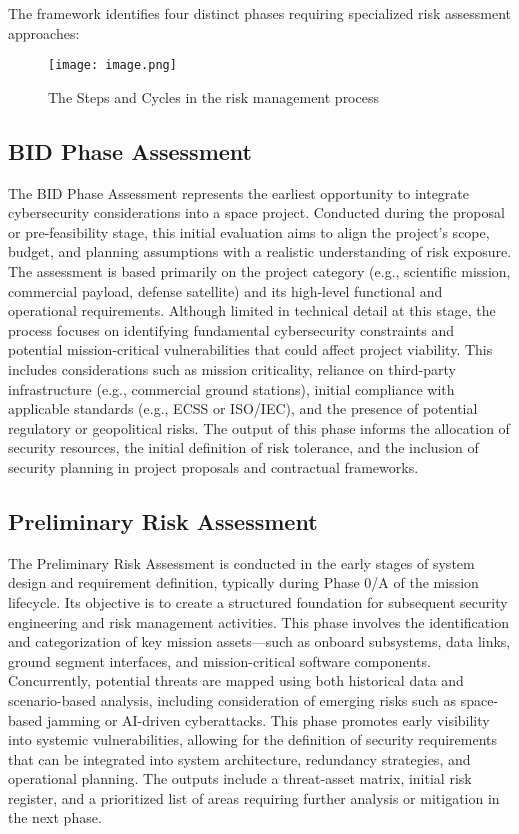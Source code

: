 \documentclass[binding=0.6cm]{sapthesis}
\begin{document}
The framework identifies four distinct phases requiring specialized risk assessment approaches:
\begin{figure}
    \centering
    \texttt{[image: image.png]}
    \caption{The Steps and Cycles in the risk management process}
    \label{fig:enter-label}
\end{figure}

\subsection{BID Phase Assessment}
The BID Phase Assessment represents the earliest opportunity to integrate cybersecurity considerations into a space project. Conducted during the proposal or pre-feasibility stage, this initial evaluation aims to align the project’s scope, budget, and planning assumptions with a realistic understanding of risk exposure. The assessment is based primarily on the project category (e.g., scientific mission, commercial payload, defense satellite) and its high-level functional and operational requirements. Although limited in technical detail at this stage, the process focuses on identifying fundamental cybersecurity constraints and potential mission-critical vulnerabilities that could affect project viability. This includes considerations such as mission criticality, reliance on third-party infrastructure (e.g., commercial ground stations), initial compliance with applicable standards (e.g., ECSS or ISO/IEC), and the presence of potential regulatory or geopolitical risks. The output of this phase informs the allocation of security resources, the initial definition of risk tolerance, and the inclusion of security planning in project proposals and contractual frameworks.

\subsection{Preliminary Risk Assessment}
The Preliminary Risk Assessment is conducted in the early stages of system design and requirement definition, typically during Phase 0/A of the mission lifecycle. Its objective is to create a structured foundation for subsequent security engineering and risk management activities. This phase involves the identification and categorization of key mission assets—such as onboard subsystems, data links, ground segment interfaces, and mission-critical software components. Concurrently, potential threats are mapped using both historical data and scenario-based analysis, including consideration of emerging risks such as space-based jamming or AI-driven cyberattacks. This phase promotes early visibility into systemic vulnerabilities, allowing for the definition of security requirements that can be integrated into system architecture, redundancy strategies, and operational planning. The outputs include a threat-asset matrix, initial risk register, and a prioritized list of areas requiring further analysis or mitigation in the next phase.
\end{document}
